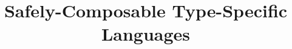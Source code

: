 \documentclass[runningheads]{llncs}
\newcommand{\todo}[1]{\textbf{[TODO: #1]}}
\begin{document}
\title{Safely-Composable Type-Specific Languages}
\author{~}
\institute{~}



\maketitle
\end{document}
